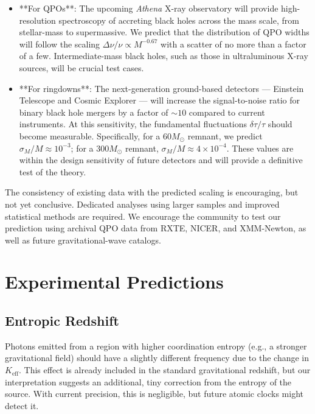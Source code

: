 \documentclass[12pt,a4paper]{article}
\newcommand{\Keff}{K_{\mathrm{eff}}}
\begin{document}
	\begin{itemize}
		\item **For QPOs**: The upcoming \textit{Athena} X-ray observatory will provide high-resolution spectroscopy of accreting black holes across the mass scale, from stellar-mass to supermassive. We predict that the distribution of QPO widths will follow the scaling \(\Delta\nu/\nu \propto M^{-0.67}\) with a scatter of no more than a factor of a few. Intermediate-mass black holes, such as those in ultraluminous X-ray sources, will be crucial test cases.
		
		\item **For ringdowns**: The next-generation ground-based detectors — Einstein Telescope and Cosmic Explorer — will increase the signal-to-noise ratio for binary black hole mergers by a factor of \(\sim 10\) compared to current instruments. At this sensitivity, the fundamental fluctuations \(\delta\tau/\tau\) should become measurable. Specifically, for a \(60 M_\odot\) remnant, we predict \(\sigma_M/M \approx 10^{-3}\); for a \(300 M_\odot\) remnant, \(\sigma_M/M \approx 4 \times 10^{-4}\). These values are within the design sensitivity of future detectors and will provide a definitive test of the theory.
	\end{itemize}
	
	The consistency of existing data with the predicted scaling is encouraging, but not yet conclusive. Dedicated analyses using larger samples and improved statistical methods are required. We encourage the community to test our prediction using archival QPO data from RXTE, NICER, and XMM-Newton, as well as future gravitational-wave catalogs.
	
	\section{Experimental Predictions}
	\label{sec:predictions}
	
	\subsection{Entropic Redshift}
	
	Photons emitted from a region with higher coordination entropy (e.g., a stronger gravitational field) should have a slightly different frequency due to the change in \(\Keff\). This effect is already included in the standard gravitational redshift, but our interpretation suggests an additional, tiny correction from the entropy of the source. With current precision, this is negligible, but future atomic clocks might detect it.
	
\end{document}
